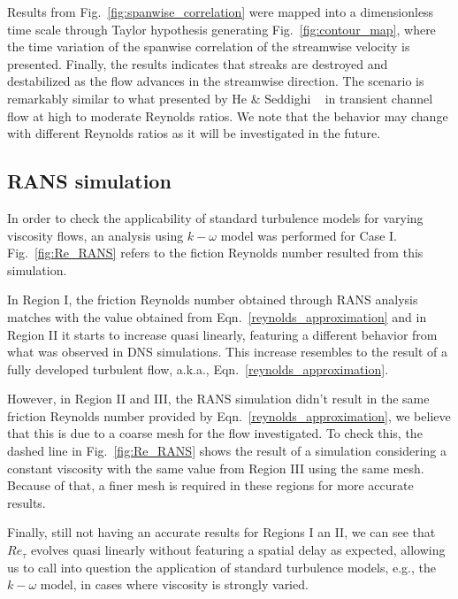 \documentclass[twocolumn,10pt]{asme2e}
\begin{document}
Results from Fig.~\ref{fig:spanwise_correlation} were mapped into a dimensionless time scale through Taylor hypothesis generating Fig.~\ref{fig:contour_map}, where the time variation of the spanwise correlation of the streamwise velocity is presented. Finally, the results indicates that streaks are destroyed and destabilized as the flow advances  in the streamwise direction. The scenario is remarkably similar to what presented by He \& Seddighi ~\cite{he2015} in transient channel flow at high to moderate Reynolds ratios.  We note that the behavior may change with different Reynolds ratios as it will be investigated in the future.

\subsection*{RANS simulation}

In order to check the applicability of standard turbulence models for varying viscosity flows, an analysis using \(k-\omega\) model was performed for Case I. Fig.~\ref{fig:Re_RANS} refers to the fiction Reynolds number resulted from this simulation.

In Region I, the friction Reynolds number obtained through RANS analysis matches with the value obtained from Eqn.~\ref{reynolds_approximation} and in Region II it starts to increase quasi linearly, featuring a different behavior from what was observed in DNS simulations. This increase resembles to the result of a fully developed turbulent flow, a.k.a., Eqn.~\ref{reynolds_approximation}.

However, in Region II and III, the RANS simulation didn't result in the same friction Reynolds number provided by Eqn.~\ref{reynolds_approximation}, we believe that this is due to a coarse mesh for the flow investigated. To check this, the dashed line in Fig.~\ref{fig:Re_RANS} shows the result of a simulation considering a constant viscosity with the same value from Region III using the same mesh. Because of that, a finer mesh is required in these regions for more accurate results.

Finally, still not having an accurate results for Regions I an II, we can see that \(Re_{\tau}\) evolves quasi linearly without featuring a spatial delay as expected, allowing us to call into question the application of standard turbulence models, e.g., the \(k-\omega\) model, in cases where viscosity is strongly varied.
\end{document}
